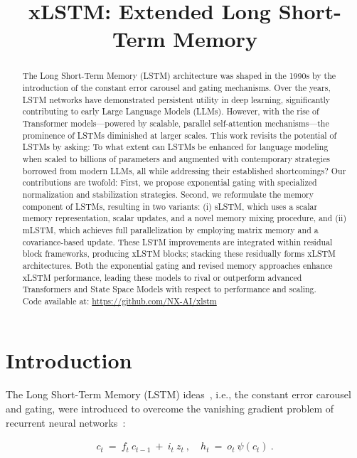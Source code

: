 \title{xLSTM: Extended Long Short-Term Memory}

\begin{abstract}
The Long Short-Term Memory (LSTM) architecture was shaped in the 1990s by the introduction of the constant error carousel and gating mechanisms. Over the years, LSTM networks have demonstrated persistent utility in deep learning, significantly contributing to early Large Language Models (LLMs). However, with the rise of Transformer models—powered by scalable, parallel self-attention mechanisms—the prominence of LSTMs diminished at larger scales. This work revisits the potential of LSTMs by asking: To what extent can LSTMs be enhanced for language modeling when scaled to billions of parameters and augmented with contemporary strategies borrowed from modern LLMs, all while addressing their established shortcomings? Our contributions are twofold: First, we propose exponential gating with specialized normalization and stabilization strategies. Second, we reformulate the memory component of LSTMs, resulting in two variants: (i) sLSTM, which uses a scalar memory representation, scalar updates, and a novel memory mixing procedure, and (ii) mLSTM, which achieves full parallelization by employing matrix memory and a covariance-based update. These LSTM improvements are integrated within residual block frameworks, producing xLSTM blocks; stacking these residually forms xLSTM architectures. Both the exponential gating and revised memory approaches enhance xLSTM performance, leading these models to rival or outperform advanced Transformers and State Space Models with respect to performance and scaling.\\
Code available at: \url{https://github.com/NX-AI/xlstm}
\end{abstract}

\section{Introduction}
\label{sec:intro}

The Long Short-Term Memory (LSTM) ideas~\citep{Hochreiter:91,Hochreiter:97nips,Hochreiter:97}, i.e., the constant error carousel and gating, were introduced to overcome the vanishing gradient problem of recurrent neural networks~\citep{Hochreiter:91,Hochreiter:00book}:

\begin{align}
\label{eq:lstm_idea}
  c_t \ = \ f_t \ c_{t-1} \ + \ 
          i_t \  z_t \ , \quad  
          h_t \ = \ o_t \ \psi({c_t}) \ . 
\end{align}

